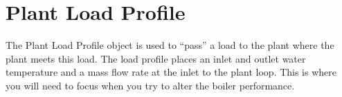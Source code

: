 \section{Plant Load Profile}\label{plant-load-profile}

The Plant Load Profile object is used to ``pass'' a load to the plant where the plant meets this load. The load profile places an inlet and outlet water temperature and a mass flow rate at the inlet to the plant loop. This is where you will need to focus when you try to alter the boiler performance.
